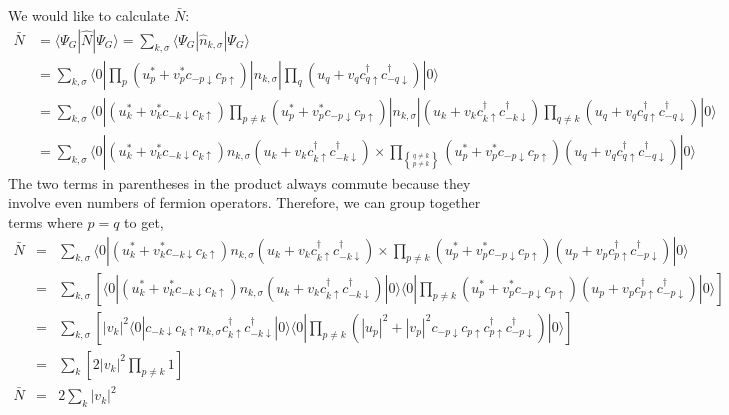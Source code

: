 \documentclass{article}
\begin{document}
We would like to calculate $\bar{N}$:
\begin{align*}
\bar{N} & = \langle\Psi_{G}|\hat{N}|\Psi_{G}\rangle=\sum_{k,\sigma}\langle\Psi_{G}|\hat{n}_{k,\sigma}|\Psi_{G}\rangle \\
& = \sum_{k,\sigma}\langle0|\prod_{p}(u_{p}^{*}+v_{p}^{*}c_{-p\downarrow}c_{p\uparrow})|n_{k,\sigma}|\prod_{q}(u_{q}+v_{q}c_{q\uparrow}^{\dagger}c_{-q\downarrow}^{\dagger})|0\rangle \\
& = \sum_{k,\sigma}\langle0|(u_{k}^{*}+v_{k}^{*}c_{-k\downarrow}c_{k\uparrow})\prod_{p\neq k}(u_{p}^{*}+v_{p}^{*}c_{-p\downarrow}c_{p\uparrow})|n_{k,\sigma}|(u_{k}+v_{k}c_{k\uparrow}^{\dagger}c_{-k\downarrow}^{\dagger})\prod_{q\neq k}(u_{q}+v_{q}c_{q\uparrow}^{\dagger}c_{-q\downarrow}^{\dagger})|0\rangle \\
& = \sum_{k,\sigma}\langle0|(u_{k}^{*}+v_{k}^{*}c_{-k\downarrow}c_{k\uparrow})n_{k,\sigma}(u_{k}+v_{k}c_{k\uparrow}^{\dagger}c_{-k\downarrow}^{\dagger})\times\prod_{{q\neq k \brace p\neq k}}(u_{p}^{*}+v_{p}^{*}c_{-p\downarrow}c_{p\uparrow})(u_{q}+v_{q}c_{q\uparrow}^{\dagger}c_{-q\downarrow}^{\dagger})|0\rangle
\end{align*}
 The two terms in parentheses in the product always commute because
they involve even numbers of fermion operators. Therefore, we can
group together terms where $p=q$ to get, \begin{eqnarray*}
\bar{N} & = & \sum_{k,\sigma}\langle0|(u_{k}^{*}+v_{k}^{*}c_{-k\downarrow}c_{k\uparrow})n_{k,\sigma}(u_{k}+v_{k}c_{k\uparrow}^{\dagger}c_{-k\downarrow}^{\dagger})\times\prod_{p\neq k}(u_{p}^{*}+v_{p}^{*}c_{-p\downarrow}c_{p\uparrow})(u_{p}+v_{p}c_{p\uparrow}^{\dagger}c_{-p\downarrow}^{\dagger})|0\rangle\\
 & = & \sum_{k,\sigma}\left[\langle0|(u_{k}^{*}+v_{k}^{*}c_{-k\downarrow}c_{k\uparrow})n_{k,\sigma}(u_{k}+v_{k}c_{k\uparrow}^{\dagger}c_{-k\downarrow}^{\dagger})|0\rangle\langle0|\prod_{p\neq k}(u_{p}^{*}+v_{p}^{*}c_{-p\downarrow}c_{p\uparrow})(u_{p}+v_{p}c_{p\uparrow}^{\dagger}c_{-p\downarrow}^{\dagger})|0\rangle\right]\\
 & = & \sum_{k,\sigma}\left[|v_{k}|^{2}\langle0|c_{-k\downarrow}c_{k\uparrow}n_{k,\sigma}c_{k\uparrow}^{\dagger}c_{-k\downarrow}^{\dagger}|0\rangle\langle0|\prod_{p\neq k}\left(|u_{p}|^{2}+|v_{p}|^{2}c_{-p\downarrow}c_{p\uparrow}c_{p\uparrow}^{\dagger}c_{-p\downarrow}^{\dagger}\right)|0\rangle\right]\\
 & = & \sum_{k}\left[2|v_{k}|^{2}\prod_{p\neq k}1\right]\\
\bar{N} & = & 2\sum_{k}|v_{k}|^{2}\end{eqnarray*}
\end{document}
